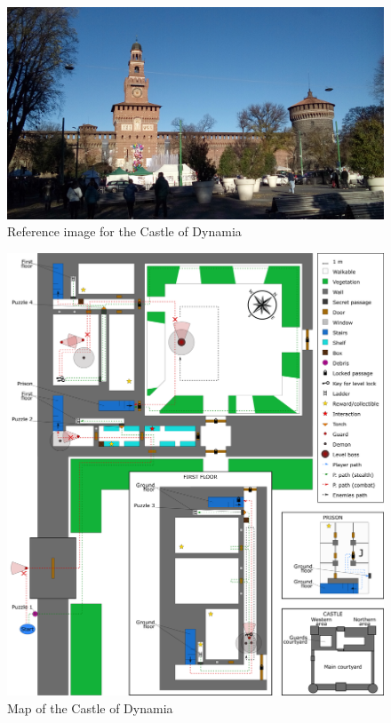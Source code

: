 \begin{figure}[H]
  \centering
  \includegraphics[width=\textwidth]{../../../References/Images/Dynamia/CastleOfDynamia/20181208_100357}
  \caption{Reference image for the Castle of Dynamia}
\end{figure}

\begin{figure}[H]
  \centering
  \includegraphics[width=\textwidth]{Images/Maps/castleOfDynamia}
  \caption{Map of the Castle of Dynamia}
\end{figure}

